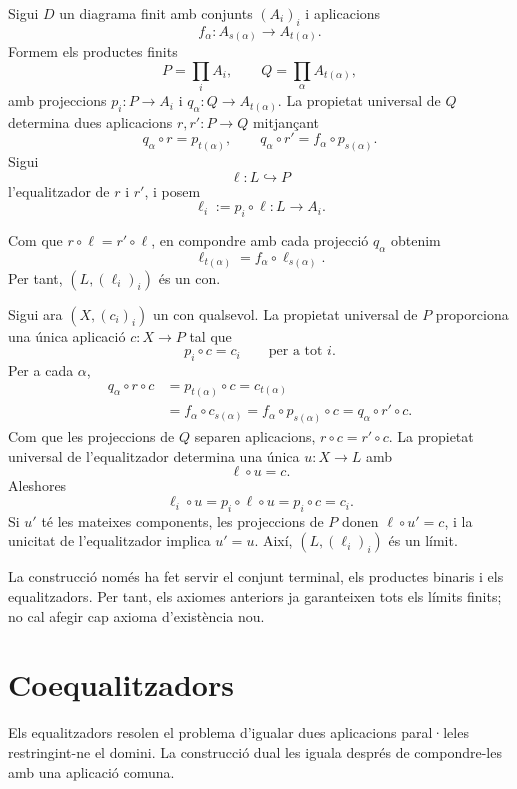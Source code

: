 \begin{prova}
Sigui \(D\) un diagrama finit amb conjunts \((A_i)_i\) i aplicacions
\[
f_\alpha:A_{s(\alpha)}\to A_{t(\alpha)}.
\]
Formem els productes finits
\[
P=\prod_i A_i,
\qquad
Q=\prod_\alpha A_{t(\alpha)},
\]
amb projeccions \(p_i:P\to A_i\) i \(q_\alpha:Q\to A_{t(\alpha)}\). La propietat universal de \(Q\) determina dues aplicacions \(r,r':P\to Q\) mitjançant
\[
q_\alpha\circ r=p_{t(\alpha)},
\qquad
q_\alpha\circ r'=f_\alpha\circ p_{s(\alpha)}.
\]
Sigui
\[
\ell:L\hookrightarrow P
\]
l'equalitzador de \(r\) i \(r'\), i posem
\[
\ell_i:=p_i\circ\ell:L\to A_i.
\]

Com que \(r\circ\ell=r'\circ\ell\), en compondre amb cada projecció \(q_\alpha\) obtenim
\[
\ell_{t(\alpha)}=f_\alpha\circ\ell_{s(\alpha)}.
\]
Per tant, \((L,(\ell_i)_i)\) és un con.

Sigui ara \((X,(c_i)_i)\) un con qualsevol. La propietat universal de \(P\) proporciona una única aplicació \(c:X\to P\) tal que
\[
p_i\circ c=c_i
\qquad\text{per a tot }i.
\]
Per a cada \(\alpha\),
\[
\begin{aligned}
q_\alpha\circ r\circ c
&=p_{t(\alpha)}\circ c
=c_{t(\alpha)}\\
&=f_\alpha\circ c_{s(\alpha)}
=f_\alpha\circ p_{s(\alpha)}\circ c
=q_\alpha\circ r'\circ c.
\end{aligned}
\]
Com que les projeccions de \(Q\) separen aplicacions, \(r\circ c=r'\circ c\). La propietat universal de l'equalitzador determina una única \(u:X\to L\) amb
\[
\ell\circ u=c.
\]
Aleshores
\[
\ell_i\circ u=p_i\circ\ell\circ u=p_i\circ c=c_i.
\]
Si \(u'\) té les mateixes components, les projeccions de \(P\) donen \(\ell\circ u'=c\), i la unicitat de l'equalitzador implica \(u'=u\). Així, \((L,(\ell_i)_i)\) és un límit.
\end{prova}

\begin{observacio}\label{obs:tots-limits-finits}
La construcció només ha fet servir el conjunt terminal, els productes binaris i els equalitzadors. Per tant, els axiomes anteriors ja garanteixen tots els límits finits; no cal afegir cap axioma d'existència nou.
\end{observacio}

\section{Coequalitzadors}\label{sec:coequalitzadors}

Els equalitzadors resolen el problema d'igualar dues aplicacions paral·leles restringint-ne el domini. La construcció dual les iguala després de compondre-les amb una aplicació comuna.

